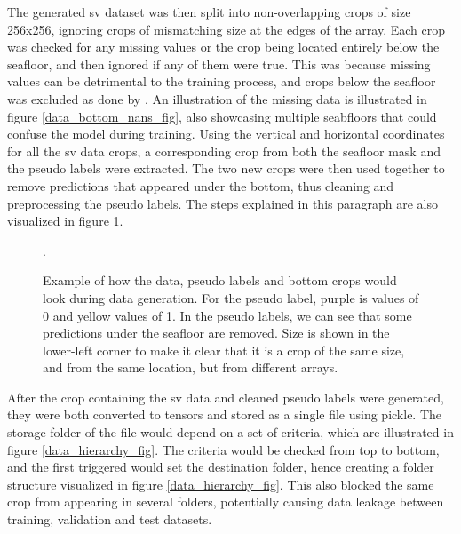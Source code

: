         
        The generated \gls{sv} dataset was then split into non-overlapping crops of size 256x256, ignoring crops of mismatching size at the edges of the array. Each crop was checked for any missing values or the crop being located entirely below the seafloor, and then ignored if any of them were true. This was because missing values can be detrimental to the training process, and crops below the seafloor was excluded as done by \citeauthor{brautaset2020acoustic}\cite{brautaset2020acoustic}. An illustration of the missing data is illustrated in figure \ref{data_bottom_nans_fig}, also showcasing multiple seabfloors that could confuse the model during training. Using the vertical and horizontal coordinates for all the \gls{sv} data crops, a corresponding crop from both the seafloor mask and the pseudo labels were extracted. The two new crops were then used together to remove predictions that appeared under the bottom, thus cleaning and preprocessing the pseudo labels. The steps explained in this paragraph are also visualized in figure \ref{crop_extract_fig}.
        \begin{figure}[H]
            \centering
            
            \caption[Data, label and bottom crop extraction and interaction]{Example of how the data, pseudo labels and bottom crops would look during data generation. For the pseudo label, purple is values of 0 and yellow values of 1. In the pseudo labels, we can see that some predictions under the seafloor are removed.  Size is shown in the lower-left corner to make it clear that it is a crop of the same size, and from the same location, but from different arrays.}.
          	\medskip 
            \label{crop_extract_fig}
        \end{figure}
        
        After the crop containing the \gls{sv} data and cleaned pseudo labels were generated, they were both converted to tensors and stored as a single file using pickle. The storage folder of the file would depend on a set of criteria, which are illustrated in figure \ref{data_hierarchy_fig}. The criteria would be checked from top to bottom, and the first triggered would set the destination folder, hence creating a folder structure visualized in figure \ref{data_hierarchy_fig}. This also blocked the same crop from appearing in several folders, potentially causing data leakage between training, validation and test datasets.
        
